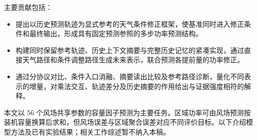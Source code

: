主要贡献包括：
\begin{itemize}
 \item 提出以历史预测轨迹为显式参考的天气条件修正框架，使基准同时进入修正条件和最终输出，形成具有固定预测参照的多步功率预测结构。
 \item 构建同时保留参考轨迹、历史上下文摘要与完整历史记忆的紧凑实现，通过直接天气路径和条件调整路径生成未来表示，联合预测各提前量的功率修正。
 \item 通过分协议对比、条件入口消融、摘要读出比较及参考路径诊断，量化不同表示的增量，对乘法交互、轨迹差分及历史摘要的作用给出与证据强度相符的解释。
\end{itemize}

本文以 56 个风场共享参数的容量因子预测为主要任务。区域功率可由风场预测按装机容量换算后求和，但风场误差与区域聚合误差对应不同评价目标。以下介绍模型方法及已有实验结果；相关工作综述暂不纳入本稿。
